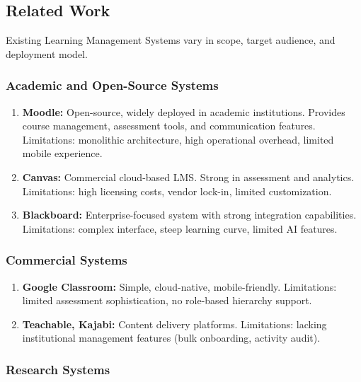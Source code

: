 \documentclass[11pt,a4paper]{article}
\begin{document}
\subsection{Related Work}

Existing Learning Management Systems vary in scope, target audience, and deployment model.

\subsubsection{Academic and Open-Source Systems}

\begin{enumerate}
    \item \textbf{Moodle:} Open-source, widely deployed in academic institutions. Provides course management, assessment tools, and communication features. Limitations: monolithic architecture, high operational overhead, limited mobile experience.

    \item \textbf{Canvas:} Commercial cloud-based LMS. Strong in assessment and analytics. Limitations: high licensing costs, vendor lock-in, limited customization.

    \item \textbf{Blackboard:} Enterprise-focused system with strong integration capabilities. Limitations: complex interface, steep learning curve, limited AI features.
\end{enumerate}

\subsubsection{Commercial Systems}

\begin{enumerate}
    \item \textbf{Google Classroom:} Simple, cloud-native, mobile-friendly. Limitations: limited assessment sophistication, no role-based hierarchy support.

    \item \textbf{Teachable, Kajabi:} Content delivery platforms. Limitations: lacking institutional management features (bulk onboarding, activity audit).
\end{enumerate}

\subsubsection{Research Systems}
\end{document}

